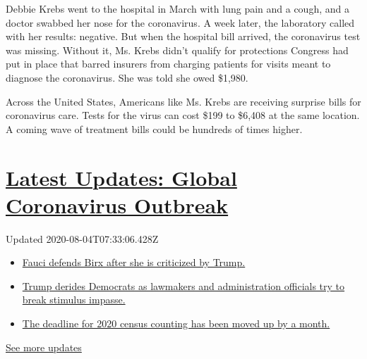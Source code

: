Debbie Krebs went to the hospital in March with lung pain and a cough,
and a doctor swabbed her nose for the coronavirus. A week later, the
laboratory called with her results: negative. But when the hospital bill
arrived, the coronavirus test was missing. Without it, Ms. Krebs didn't
qualify for protections Congress had put in place that barred insurers
from charging patients for visits meant to diagnose the coronavirus. She
was told she owed \$1,980.

Across the United States, Americans like Ms. Krebs are receiving
surprise bills for coronavirus care. Tests for the virus can cost \$199
to \$6,408 at the same location. A coming wave of treatment bills could
be hundreds of times higher.

\hypertarget{latest-updates-global-coronavirus-outbreak}{%
\section{\texorpdfstring{\href{https://www.nytimes3xbfgragh.onion/2020/08/03/world/coronavirus-covid-19.html?action=click\&pgtype=Article\&state=default\&region=MAIN_CONTENT_1\&context=storylines_live_updates}{Latest
Updates: Global Coronavirus
Outbreak}}{Latest Updates: Global Coronavirus Outbreak}}\label{latest-updates-global-coronavirus-outbreak}}

Updated 2020-08-04T07:33:06.428Z

\begin{itemize}
\tightlist
\item
  \href{https://www.nytimes3xbfgragh.onion/2020/08/03/world/coronavirus-covid-19.html?action=click\&pgtype=Article\&state=default\&region=MAIN_CONTENT_1\&context=storylines_live_updates\#link-4547638f}{Fauci
  defends Birx after she is criticized by Trump.}
\item
  \href{https://www.nytimes3xbfgragh.onion/2020/08/03/world/coronavirus-covid-19.html?action=click\&pgtype=Article\&state=default\&region=MAIN_CONTENT_1\&context=storylines_live_updates\#link-15e7f995}{Trump
  derides Democrats as lawmakers and administration officials try to
  break stimulus impasse.}
\item
  \href{https://www.nytimes3xbfgragh.onion/2020/08/03/world/coronavirus-covid-19.html?action=click\&pgtype=Article\&state=default\&region=MAIN_CONTENT_1\&context=storylines_live_updates\#link-e5a2cda}{The
  deadline for 2020 census counting has been moved up by a month.}
\end{itemize}

\href{https://www.nytimes3xbfgragh.onion/2020/08/03/world/coronavirus-covid-19.html?action=click\&pgtype=Article\&state=default\&region=MAIN_CONTENT_1\&context=storylines_live_updates}{See
more updates}

